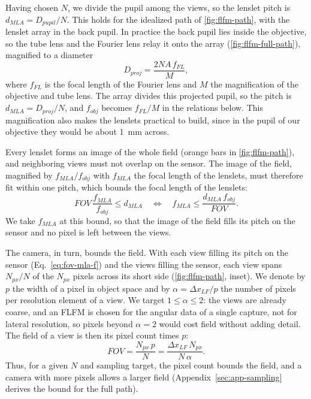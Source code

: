 Having chosen $N$, we divide the pupil among the views, so the lenslet pitch is $d_{MLA}=D_{pupil}/N$. This holds for the idealized path of \cref{fig:flfm-path}, with the lenslet array in the back pupil. In practice the back pupil lies inside the objective, so the tube lens and the Fourier lens relay it onto the array (\cref{fig:flfm-full-path}), magnified to a diameter
\begin{equation}
    D_{proj} = \frac{2NA\,f_{FL}}{M},
    \label{eq:d-proj}
\end{equation}
where $f_{FL}$ is the focal length of the Fourier lens and $M$ the magnification of the objective and tube lens. The array divides this projected pupil, so the pitch is $d_{MLA}=D_{proj}/N$, and $f_{obj}$ becomes $f_{FL}/M$ in the relations below. This magnification also makes the lenslets practical to build, since in the pupil of our objective they would be about 1~mm across.

Every lenslet forms an image of the whole field (orange bars in \cref{fig:flfm-path}), and neighboring views must not overlap on the sensor. The image of the field, magnified by $f_{MLA}/f_{obj}$ with $f_{MLA}$ the focal length of the lenslets, must therefore fit within one pitch, which bounds the focal length of the lenslets:
\begin{equation}
    FOV\,\frac{f_{MLA}}{f_{obj}} \le d_{MLA}
    \quad\Longleftrightarrow\quad
    f_{MLA} \le \frac{d_{MLA}\,f_{obj}}{FOV}.
    \label{eq:fov-mla-f}
\end{equation}
We take $f_{MLA}$ at this bound, so that the image of the field fills its pitch on the sensor and no pixel is left between the views.

The camera, in turn, bounds the field. With each view filling its pitch on the sensor (Eq.~\eqref{eq:fov-mla-f}) and the views filling the sensor, each view spans $N_{px}/N$ of the $N_{px}$ pixels across its short side (\cref{fig:flfm-path}, inset). We denote by $p$ the width of a pixel in object space and by $\alpha=\Delta x_{LF}/p$ the number of pixels per resolution element of a view. We target $1\le\alpha\le2$: the views are already coarse, and an FLFM is chosen for the angular data of a single capture, not for lateral resolution, so pixels beyond $\alpha=2$ would cost field without adding detail. The field of a view is then its pixel count times $p$:
\begin{equation}
    FOV = \frac{N_{px}\,p}{N} = \frac{\Delta x_{LF}\,N_{px}}{N\,\alpha}.
    \label{eq:fov-pixels}
\end{equation}
Thus, for a given $N$ and sampling target, the pixel count bounds the field, and a camera with more pixels allows a larger field (Appendix~\ref{sec:app-sampling} derives the bound for the full path).

